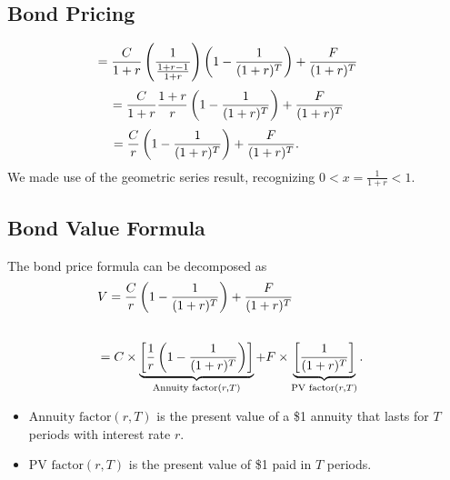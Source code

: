 \documentclass[letterpaper,10pt,english]{sphinxmanual}
\begin{document}
\subsection{Bond Pricing}
\label{bondPrices:id8}\begin{gather}
\begin{split}& = \frac{C}{1+r} \left(\frac{1}{\frac{1+r-1}{1+r}}\right)
\left(1 - \frac{1}{(1+r)^T}\right) + \frac{F}{(1+r)^T} \; \;\end{split}\notag
\end{gather}\begin{gather}
\begin{split}\hspace{0.25in} & = \frac{C}{1+r} \frac{1+r}{r} \left(1 -
\frac{1}{(1+r)^T}\right) + \frac{F}{(1+r)^T} \qquad \;\end{split}\notag
\end{gather}\begin{gather}
\begin{split}& = \frac{C}{r} \left(1 - \frac{1}{(1+r)^T}\right) +
\frac{F}{(1+r)^T}. \qquad \qquad\end{split}\notag
\end{gather}
We made use of the geometric series result,
recognizing $0 < x = \frac{1}{1+r} < 1$.


\subsection{Bond Value Formula}
\label{bondPrices:bond-value-formula}
The bond price formula can be decomposed as
\label{bondPrices:equation-bondprice}\begin{gather}
\begin{split}V & = \frac{C}{r} \left(1 - \frac{1}{(1+r)^T}\right) +
\frac{F}{(1+r)^T} \qquad \qquad \quad \enspace\end{split}\label{bondPrices-bondprice}\\\begin{split}\end{split}\notag
\end{gather}\begin{gather}
\begin{split}& = C \times \underbrace{\left[\frac{1}{r} \left(1 -
\frac{1}{(1+r)^T}\right)\right]}_{\text{Annuity factor}(r,T)} + F
\times \underbrace{\left[\frac{1}{(1+r)^T}\right]}_{\text{PV
factor}(r,T)}.\end{split}\notag
\end{gather}\begin{itemize}
\item {} 
$\text{Annuity factor}(r,T)$ is the present value of a \$1
annuity that lasts for $T$ periods with interest rate
$r$.

\end{itemize}
\begin{itemize}
\item {} 
$\text{PV factor}(r,T)$ is the present value of \$1 paid in
$T$ periods.

\end{itemize}
\end{document}

